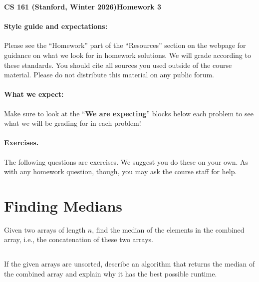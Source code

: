 \documentclass[12pt]{article}
\begin{document}
	{\LARGE
		\textbf{CS 161 (Stanford, Winter 2026)}\hfill\textbf{Homework 3}
	}
	
	\vspace{1em}
	\begin{Instruction}
	\paragraph{Style guide and expectations:} Please see the ``Homework'' part of the ``Resources'' section on the webpage for guidance on what we look for in homework solutions. We will grade according to these standards. You should cite all sources you used outside of the course material. Please do not distribute this material on any public forum.
	
	\paragraph{What we expect:} Make sure to look at the ``\textbf{We are expecting}'' blocks below each problem to see what we will be grading for in each problem!
	\end{Instruction}
	
	\vspace{1em}
	\begin{Instruction}
		\paragraph{Exercises.} The following questions are exercises. We suggest you do these on your own. As with any homework question, though, you may ask the course staff for help.
	\end{Instruction}
	
	\section{Finding Medians}
	Given two arrays of length $n$, find the median of the elements in the combined array, i.e., the concatenation of these two arrays.
	\subsection{} 
    If the given arrays are unsorted, describe an algorithm that returns the median of the combined array and explain why it has the best possible runtime.
    
    \begin{Solution}
        
    \end{Solution}
        
\end{document}
